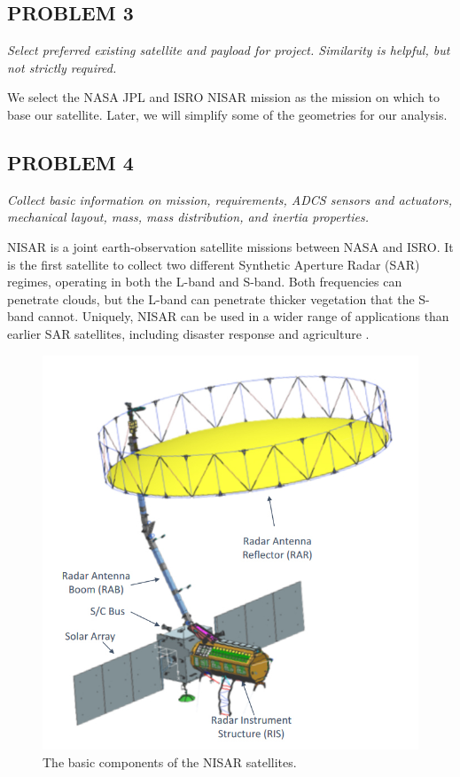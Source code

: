 \subsection{PROBLEM 3}
\textit{Select preferred existing satellite and payload for project. Similarity is helpful, but not strictly required.}

We select the NASA JPL and ISRO NISAR mission as the mission on which to base our satellite. Later, we will simplify some of the geometries for our analysis.

\subsection{PROBLEM 4}
\textit{Collect basic information on mission, requirements, ADCS sensors and actuators, mechanical layout, mass, mass distribution, and inertia properties.}

NISAR is a joint earth-observation satellite missions between NASA and ISRO. It is the first satellite to collect two different Synthetic Aperture Radar (SAR) regimes, operating in both the L-band and S-band. Both frequencies can penetrate clouds, but the L-band can penetrate thicker vegetation that the S-band cannot. Uniquely, NISAR can be used in a wider range of applications than earlier SAR satellites, including disaster response and agriculture \cite{NISARApps}.

\begin{figure}[H]
\centering
\includegraphics[scale=0.4]{Images/NISAR Diagram.jpg}
\caption{The basic components of the NISAR satellites.}
\label{NISAR Diagram}
\end{figure}

